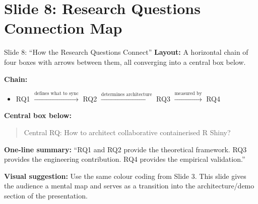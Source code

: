 \documentclass[12pt,a4paper]{article}
\begin{document}
\section{Slide 8: Research Questions Connection Map}

\begin{slidebox}{Slide 8: ``How the Research Questions Connect''}
\textbf{Layout:} A horizontal chain of four boxes with arrows between them, all converging into a central box below.

\textbf{Chain:}
\begin{itemize}[nosep]
  \item RQ1 $\xrightarrow{\text{defines what to sync}}$ RQ2 $\xrightarrow{\text{determines architecture}}$ RQ3 $\xrightarrow{\text{measured by}}$ RQ4
\end{itemize}

\textbf{Central box below:}
\begin{quote}
Central RQ: How to architect collaborative containerised R Shiny?
\end{quote}

\textbf{One-line summary:}
``RQ1 and RQ2 provide the theoretical framework. RQ3 provides the engineering contribution. RQ4 provides the empirical validation.''

\textbf{Visual suggestion:} Use the same colour coding from Slide 3. This slide gives the audience a mental map and serves as a transition into the architecture/demo section of the presentation.
\end{slidebox}
\end{document}
